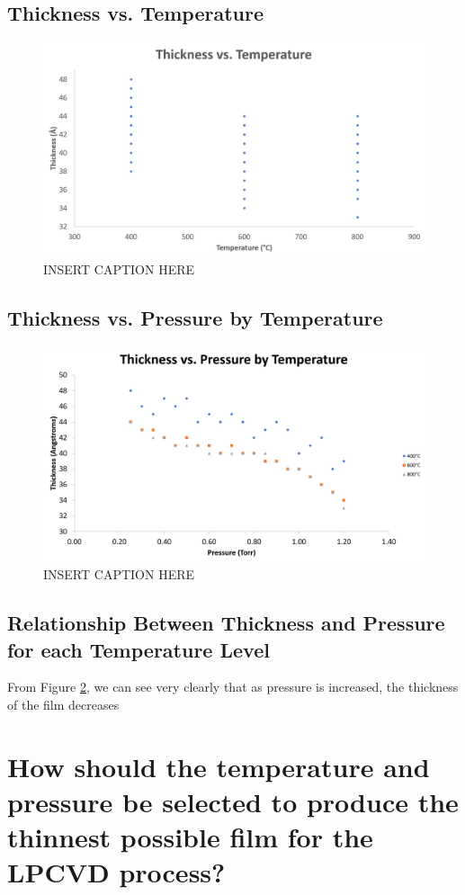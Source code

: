 \documentclass[letterpaper]{article}
\begin{document}
\subsection{Thickness vs. Temperature}

\begin{figure}[H]
 \centering
 \includegraphics[width=\textwidth]{thiccvstemp.png}
 \caption{INSERT CAPTION HERE}
 \label{thiccvstemp}
\end{figure}

\subsection{Thickness vs. Pressure by Temperature}

\begin{figure}[H]
 \centering
 \includegraphics[width=\textwidth]{thiccvspressurebytemp.png}
 \caption{INSERT CAPTION HERE}
 \label{thiccvspressurebytemp}
\end{figure}


\subsection{Relationship Between Thickness and Pressure for each Temperature Level}

From Figure \ref{thiccvspressurebytemp}, we can see very clearly that as pressure
is increased, the thickness of the film decreases

\section{How should the temperature and pressure be selected to produce the thinnest possible film for the LPCVD process?}
\end{document}
